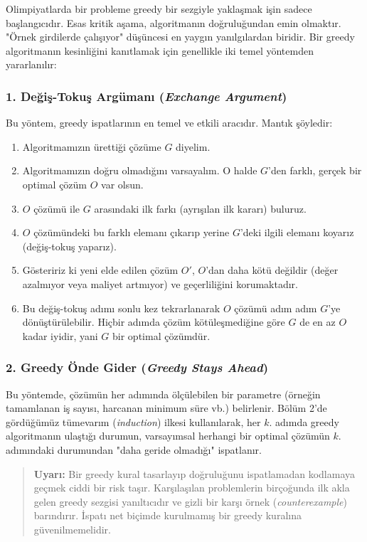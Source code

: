 Olimpiyatlarda bir probleme greedy bir sezgiyle yaklaşmak işin sadece başlangıcıdır. Esas kritik aşama, algoritmanın doğruluğundan emin olmaktır. "Örnek girdilerde çalışıyor" düşüncesi en yaygın yanılgılardan biridir. Bir greedy algoritmanın kesinliğini kanıtlamak için genellikle iki temel yöntemden yararlanılır:

\subsubsection{1. Değiş-Tokuş Argümanı (\textit{Exchange Argument})}
Bu yöntem, greedy ispatlarının en temel ve etkili aracıdır.
Mantık şöyledir:
\begin{enumerate}
    \item Algoritmamızın ürettiği çözüme $G$ diyelim.
    \item Algoritmamızın doğru olmadığını varsayalım. O halde $G$'den farklı, gerçek bir optimal çözüm $O$ var olsun.
    \item $O$ çözümü ile $G$ arasındaki ilk farkı (ayrışılan ilk kararı) buluruz.
    \item $O$ çözümündeki bu farklı elemanı çıkarıp yerine $G$'deki ilgili elemanı koyarız (değiş-tokuş yaparız).
    \item Gösteririz ki yeni elde edilen çözüm $O'$, $O$'dan daha kötü değildir (değer azalmıyor veya maliyet artmıyor) ve geçerliliğini korumaktadır.
    \item Bu değiş-tokuş adımı sonlu kez tekrarlanarak $O$ çözümü adım adım $G$'ye dönüştürülebilir. Hiçbir adımda çözüm kötüleşmediğine göre $G$ de en az $O$ kadar iyidir, yani $G$ bir optimal çözümdür.
\end{enumerate}

\subsubsection{2. Greedy Önde Gider (\textit{Greedy Stays Ahead})}
Bu yöntemde, çözümün her adımında ölçülebilen bir parametre (örneğin tamamlanan iş sayısı, harcanan minimum süre vb.) belirlenir. Bölüm 2'de gördüğümüz tümevarım (\textit{induction}) ilkesi kullanılarak, her $k$. adımda greedy algoritmanın ulaştığı durumun, varsayımsal herhangi bir optimal çözümün $k$. adımındaki durumundan "daha geride olmadığı" ispatlanır.

\begin{quote}
\textbf{Uyarı:} Bir greedy kural tasarlayıp doğruluğunu ispatlamadan kodlamaya geçmek ciddi bir risk taşır. Karşılaşılan problemlerin birçoğunda ilk akla gelen greedy sezgisi yanıltıcıdır ve gizli bir karşı örnek (\textit{counterexample}) barındırır. İspatı net biçimde kurulmamış bir greedy kuralına güvenilmemelidir.
\end{quote}

